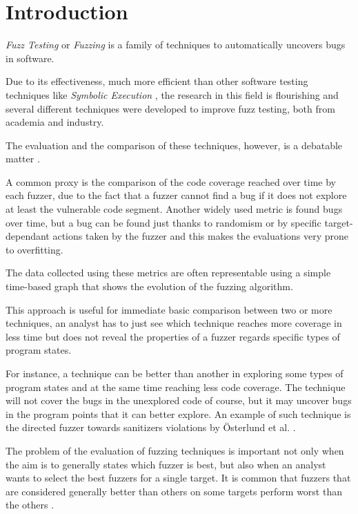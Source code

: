 \documentclass[conference,compsoc]{IEEEtran}
\begin{document}
\section{Introduction}

{\em Fuzz Testing} or {\em Fuzzing} is a family of techniques to automatically uncovers bugs in software.

Due to its effectiveness, much more efficient than other software testing techniques like {\it Symbolic Execution} \cite{redqueen} \cite{sebastian}, the research in this field is flourishing and several different techniques were developed to improve fuzz testing, both from academia and industry.

The evaluation and the comparison of these techniques, however, is a debatable matter \cite{fuzzeval}.

A common proxy is the comparison of the code coverage reached over time by each fuzzer, due to the fact that a fuzzer cannot find a bug if it does not explore at least the vulnerable code segment.
Another widely used metric is found bugs over time, but a bug can be found just thanks to randomism or by specific target-dependant actions taken by the fuzzer and this makes the evaluations very prone to overfitting.

The data collected using these metrics are often representable using a simple time-based graph that shows the evolution of the fuzzing algorithm.

This approach is useful for immediate basic comparison between two or more techniques, an analyst has to just see which technique reaches more coverage in less time but does not reveal the properties of a fuzzer regards specific types of program states.

For instance, a technique can be better than another in exploring some types of program states and at the same time reaching less code coverage.
The technique will not cover the bugs in the unexplored code of course, but it may uncover bugs in the program points that it can better explore.
An example of such technique is the directed fuzzer towards sanitizers violations by \"Osterlund et al. \cite{parmesan}.

The problem of the evaluation of fuzzing techniques is important not only when the aim is to generally states which fuzzer is best, but also when an analyst wants to select the best fuzzers for a single target. It is common that fuzzers that are considered generally better than others on some targets perform worst than the others \cite{aflplusplus}.
\end{document}
